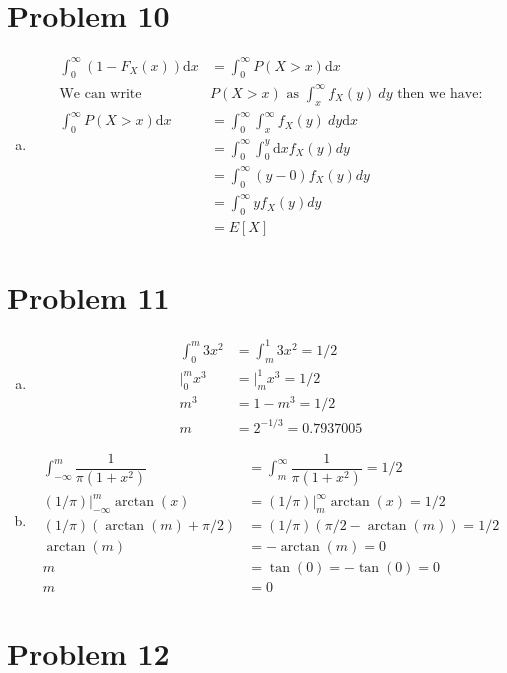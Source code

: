 \documentclass{article}
\newcommand{\dx}{\mathrm{d}x}
\begin{document}
\begin{flushleft}
\section*{Problem 10}
\begin{enumerate}[(a)]
\item 
\begin{align*}
\int_{0}^{\infty}(1-F_X(x))\dx &=\int_{0}^{\infty}P(X>x)\dx\\
\text{We can write } & P(X>x) \text{ as } \int_{x}^{\infty}f_X(y) \ dy \text{ then we have:}\\
\int_{0}^{\infty}P(X>x)\dx&=\int_{0}^{\infty}\int_{x}^{\infty}f_X(y) \ dy \dx\\
&=\int_{0}^{\infty}\int_{0}^{y}\dx f_X(y) dy\\
&=\int_{0}^{\infty}(y-0)f_X(y)dy\\
&=\int_{0}^{\infty}yf_X(y)dy\\
&=E[X]
\end{align*}
\end{enumerate}
\pagebreak
\section{Problem 11}
\begin{enumerate}[(a)]
\item
\begin{align*}
\int_{0}^{m}3x^2&=\int_{m}^{1}3x^2=1/2\\
\bigg |_{0}^m x^3&=\bigg |_{m}^1 x^3=1/2\\
m^3&=1-m^3=1/2\\
m&=2^{-1/3}=0.7937005
\end{align*}
\item 
\begin{align*}
\int_{-\infty}^{m}\dfrac{1}{\pi(1+x^2)}&=\int_{m}^{\infty}\dfrac{1}{\pi(1+x^2)}=1/2\\
(1/\pi)\bigg |_{-\infty}^{m}\arctan(x)&= (1/\pi)\bigg|_{m}^{\infty}\arctan(x)=1/2\\
(1/\pi) (\arctan(m)+\pi/2)&=(1/\pi)(\pi/2-\arctan(m))=1/2\\
\arctan(m)&=-\arctan(m)=0\\
m&=\tan(0)=-\tan(0)=0\\
m&=0
\end{align*}
\end{enumerate}
\section*{Problem 12}

\end{flushleft}
\end{document}
